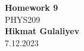 \begin{titlepage}
    \begin{center}
    {\fontsize{40}{48}\selectfont \bfseries Homework 9} 
    \\\vspace{20pt}
    {\LARGE PHYS209} \\
    \vspace{20pt}
    \textbf{Hikmat Gulaliyev}
    \vspace{8pt}
    \\ 7.12.2023
    \end{center}
\end{titlepage}